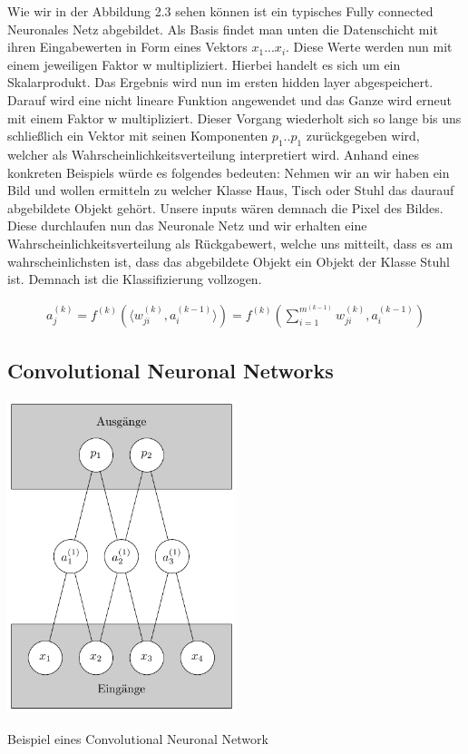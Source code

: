 Wie wir in der Abbildung 2.3 sehen können ist ein typisches Fully connected Neuronales Netz abgebildet. Als Basis findet man unten die Datenschicht mit ihren Eingabewerten in Form eines Vektors $x_1 ... x_i$. Diese Werte werden nun mit einem jeweiligen Faktor w multipliziert. Hierbei handelt es sich um ein Skalarprodukt. Das Ergebnis wird nun im ersten hidden layer abgespeichert. Darauf wird eine nicht lineare Funktion angewendet und das Ganze wird erneut mit einem Faktor w multipliziert. Dieser Vorgang wiederholt sich so lange bis uns schließlich ein Vektor mit seinen Komponenten $p_1 .. p_1$ zurückgegeben wird, welcher als Wahrscheinlichkeitsverteilung interpretiert wird. Anhand eines konkreten Beispiels würde es folgendes bedeuten:
Nehmen wir an wir haben ein Bild und wollen ermitteln zu welcher Klasse Haus, Tisch oder Stuhl das daurauf abgebildete Objekt gehört. Unsere inputs wären demnach die Pixel des Bildes. Diese durchlaufen nun das Neuronale Netz und wir erhalten eine Wahrscheinlichkeitsverteilung als Rückgabewert, welche uns mitteilt, dass es am wahrscheinlichsten ist, dass das abgebildete Objekt ein Objekt der Klasse Stuhl ist. Demnach ist die Klassifizierung vollzogen.


\begin{align*}
a_j^{(k)} = f^{(k)} (\langle w_{ji}^{(k)}, a_i^{(k-1)}\rangle) = f^{(k)} (\sum_{i=1}^{m^{(k-1)}} w_{ji}^{(k)},a_i^{(k-1)} )
\end{align*}

\subsection{Convolutional Neuronal Networks}

\begin{dsafigure}
\begin{center}
	\includegraphics[width=0.5\textwidth]{Figure_ConvNN}
	\caption{Beispiel eines Convolutional Neuronal Network}
	\label{NN1}
	\end{center}
\end{dsafigure}


